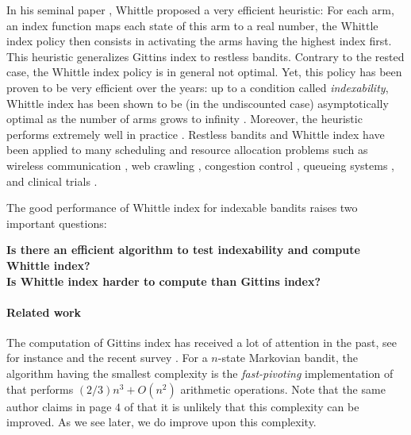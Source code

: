 \documentclass[acmsmall,screen,anonymous]{acmart}
\begin{document}
In his seminal paper \cite{whittle1988restless}, Whittle proposed a very efficient heuristic: For each arm, an index function maps each state of this arm to a real number, the Whittle index policy then consists in activating the arms having the highest index first. This heuristic generalizes Gittins index to restless bandits. Contrary to the rested case, the Whittle index policy is in general not optimal. Yet, this policy has been proven to be very efficient over the years: up to a condition called \emph{indexability}, Whittle index has been shown to be (in the undiscounted case) asymptotically optimal as the number of arms grows to infinity \cite{lott2000optimality, weber1990index}. Moreover, the heuristic performs extremely well in practice \cite{glazebrook2006some, ansell2003whittle, glazebrook2002index}. Restless bandits and Whittle index have been applied to many scheduling and resource allocation problems such as wireless communication \cite{aalto2019whittle, liu2010indexability}, web crawling \cite{avrachenkov2020whittle, nino2014dynamic}, congestion control \cite{avrachenkov2013congestion, avrachenkov2018impulsive}, queueing systems \cite{scully2018soap, aalto2011properties,aalto2009gittins,borkar2017whittle, larranaga2015asymptotically, archibald2009indexability, glazebrook2009index}, and clinical trials \cite{villar2015multi}. 

The good performance of Whittle index for indexable bandits raises two important questions:
\begin{center}
\bfseries
Is there an efficient algorithm to test indexability and compute Whittle index?\\Is Whittle index harder to compute than Gittins index?
\end{center}

\paragraph*{Related work}
The computation of Gittins index has received a lot of attention in the past, see for instance \cite{chen1986linear, katehakis1987multi, nino-moraFastPivotingAlgorithmGittins2007, sonin2008generalized} and the recent survey \cite{chakravortyMultiArmedBanditsGittins2014}. For a $n$-state Markovian bandit, the algorithm having the smallest complexity is the \emph{fast-pivoting} implementation of \cite{nino-moraFastPivotingAlgorithmGittins2007} that performs $(2/3)n^3+O(n^2)$ arithmetic operations. Note that the same author claims in page $4$ of \cite{nino2020fast} that it is unlikely that this complexity can be improved. As we see later, we do improve upon this complexity. 
\end{document}

